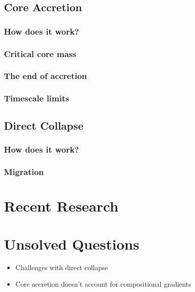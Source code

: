 \documentclass[twocolumn, twocolappendix]{aastex631}
\begin{document}
\subsection{Core Accretion}

\subsubsection{How does it work?}

\citep{Pollack+1996}

\subsubsection{Critical core mass}
\subsubsection{The end of accretion}

\subsubsection{Timescale limits}

\subsection{Direct Collapse}

\subsubsection{How does it work?}

\subsubsection{Migration}

\section{Recent Research}

\section{Unsolved Questions}

\begin{itemize}
    \item Challenges with direct collapse \citep{Forgan+2013}
    \item Core accretion doesn't account for compositional gradients \citep{D'Angelo+2018}
\end{itemize}


{}
\end{document}
